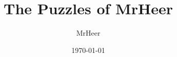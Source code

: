 \documentclass[12pt]{article}
\title{The Puzzles of MrHeer}
\author{MrHeer}
\date{\today}
\numberwithin{equation}{section}
\begin{document}
\begin{titlepage}
    \maketitle
    \thispagestyle{empty}
\end{titlepage}

\begin{center}
    \tableofcontents
\end{center}

\newpage
{}
\setcounter{page}{1}












\end{document}
